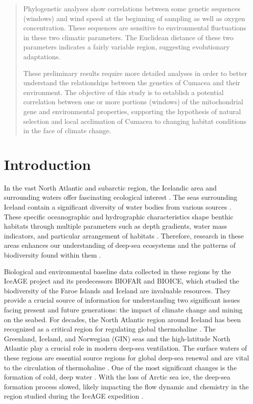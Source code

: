 \begin{abstract}
Phylogenetic analyses show correlations between some genetic sequences (windows) and wind speed at the beginning of sampling as well as oxygen concentration. These sequences are sensitive to environmental fluctuations in these two climatic parameters. The Euclidean distance of these two parameters indicates a fairly variable region, suggesting evolutionary adaptations.

These preliminary results require more detailed analyses in order to better understand the relationships between the genetics of Cumacea and their environment. The objective of this study is to establish a potential correlation between one or more portions (windows) of the mitochondrial gene and environmental properties, supporting the hypothesis of natural selection and local acclimation of Cumacea to changing habitat conditions in the face of climate change.

\end{abstract}

\section{Introduction}\label{introduction}
In the vast North Atlantic and subarctic region, the Icelandic area and surrounding waters offer fascinating ecological interest \citep{schnurr_composition_2014,uhlir_adding_2021}. The seas surrounding Iceland contain a significant diversity of water bodies from various sources \citep{brix_iceage_2014}. These specific oceanographic and hydrographic characteristics shape benthic habitats through multiple parameters such as depth gradients, water mass indicators, and particular arrangement of habitats \citep{meisner_benthic_2014,uhlir_adding_2021}. Therefore, research in these areas enhances our understanding of deep-sea ecosystems and the patterns of biodiversity found within them \citep{rogers2007corals,meisner_prefacebiodiversity_2018}.

Biological and environmental baseline data collected in these regions by the IceAGE project and its predecessors BIOFAR and BIOICE, which studied the biodiversity of the Faroe Islands and Iceland \citep{meisner_prefacebiodiversity_2018} are invaluable resources. They provide a crucial source of information for understanding two significant issues facing present and future generations: the impact of climate change and mining on the seabed. For decades, the North Atlantic region around Iceland has been recognized as a critical region for regulating global thermohaline \citep{meisner_prefacebiodiversity_2018}. The Greenland, Iceland, and Norwegian (GIN) seas and the high-latitude North Atlantic play a crucial role in modern deep-sea ventilation. The surface waters of these regions are essential source regions for global deep-sea renewal and are vital to the circulation of thermohaline \citep{johannessen_relationship_1994}. One of the most significant changes is the formation of cold, deep water \citep{meisner_prefacebiodiversity_2018}. With the loss of Arctic sea ice, the deep-sea formation process slowed, likely impacting the flow dynamic and chemistry in the region studied during the IceAGE expedition \citep{meisner_prefacebiodiversity_2018}.

